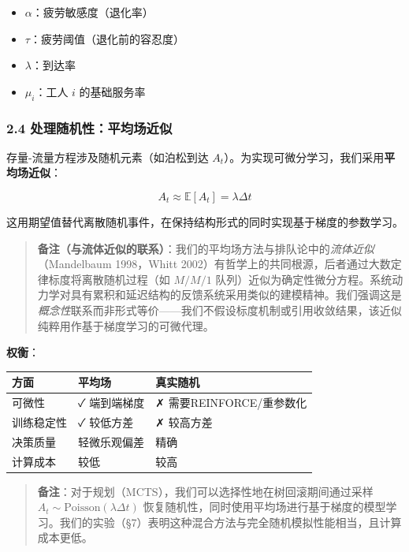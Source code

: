 \documentclass[UTF8]{ctexart}
\providecommand{\tightlist}{%
  \setlength{\itemsep}{0pt}\setlength{\parskip}{0pt}}
\begin{document}
\begin{itemize}
\tightlist
\item
  \(\alpha\)：疲劳敏感度（退化率）
\item
  \(\tau\)：疲劳阈值（退化前的容忍度）
\item
  \(\lambda\)：到达率
\item
  \(\mu_i\)：工人 \(i\) 的基础服务率
\end{itemize}

\hypertarget{ux5904ux7406ux968fux673aux6027ux5e73ux5747ux573aux8fd1ux4f3c}{%
\subsubsection{2.4
处理随机性：平均场近似}\label{ux5904ux7406ux968fux673aux6027ux5e73ux5747ux573aux8fd1ux4f3c}}

存量-流量方程涉及随机元素（如泊松到达
\(A_t\)）。为实现可微分学习，我们采用\textbf{平均场近似}：

\[A_t \approx \mathbb{E}[A_t] = \lambda \Delta t\]

这用期望值替代离散随机事件，在保持结构形式的同时实现基于梯度的参数学习。

\begin{quote}
\textbf{备注（与流体近似的联系）}：我们的平均场方法与排队论中的\emph{流体近似}（Mandelbaum
1998，Whitt
2002）有哲学上的共同根源，后者通过大数定律标度将离散随机过程（如
\(M/M/1\)
队列）近似为确定性微分方程。系统动力学对具有累积和延迟结构的反馈系统采用类似的建模精神。我们强调这是\emph{概念性}联系而非形式等价------我们不假设标度机制或引用收敛结果，该近似纯粹用作基于梯度学习的可微代理。
\end{quote}

\textbf{权衡}：

\begin{table}[h]
\centering
\begin{tabular}{p{3cm}p{5cm}p{6cm}}
\toprule
\textbf{方面} & \textbf{平均场} & \textbf{真实随机} \\
\midrule
可微性 & ✓ 端到端梯度 & ✗ 需要REINFORCE/重参数化 \\
训练稳定性 & ✓ 较低方差 & ✗ 较高方差 \\
决策质量 & 轻微乐观偏差 & 精确 \\
计算成本 & 较低 & 较高 \\
\bottomrule
\end{tabular}
\end{table}

\begin{quote}
\textbf{备注}：对于规划（MCTS），我们可以选择性地在树回滚期间通过采样
\(A_t \sim \text{Poisson}(\lambda \Delta t)\)
恢复随机性，同时使用平均场进行基于梯度的模型学习。我们的实验（§7）表明这种混合方法与完全随机模拟性能相当，且计算成本更低。
\end{quote}
\end{document}
